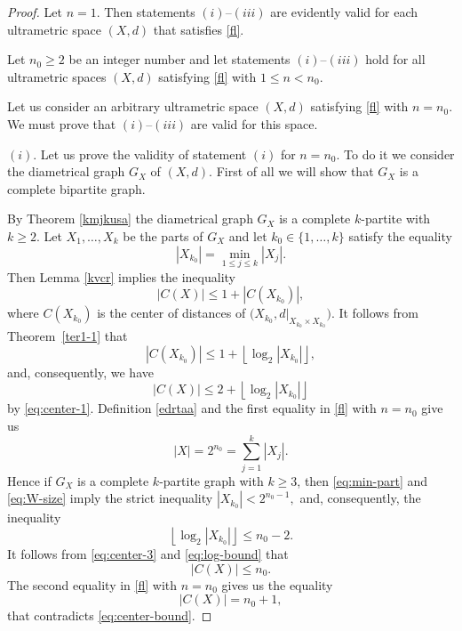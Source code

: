 \documentclass{raex}
\theoremstyle{definition}
\theoremstyle{remark}
\numberwithin{equation}{section}
\begin{document}
\begin{proof}
Let $n=1$. Then statements $(i)$--$(iii)$ are evidently valid for each ultrametric space $(X,d)$ that satisfies \eqref{fl}.

Let $n_0 \geq 2$ be an integer number and let statements $(i)$--$(iii)$ hold for all ultrametric spaces $(X,d)$ satisfying \eqref{fl} with $1\leq n<n_0$.

Let us consider an arbitrary ultrametric space $(X,d)$ satisfying \eqref{fl} with $n=n_0$. We must prove that $(i)$--$(iii)$ are valid for this space.

$(i)$. Let us prove the validity of statement $(i)$ for $n=n_0$. To do it we consider the diametrical graph $G_X$ of $(X,d)$. First of all we will show that $G_X$ is a complete bipartite graph.

By Theorem \ref{kmjkusa} the diametrical graph $G_X$ is a complete $k$-partite with $k\ge 2$.  Let $X_1,\dots,X_k$ be the parts of $G_X$ and let $k_0\in\{1,\dots,k\}$ satisfy the equality
\begin{equation}\label{eq:min-part}
|X_{k_0}|=\min_{1\le j\le k}|X_j|.
\end{equation}
Then Lemma \ref{kvcr} implies the inequality
\begin{equation}\label{eq:center-1}
|C(X)|\le 1+|C(X_{k_0})|,
\end{equation}
where $C(X_{k_0})$ is the center of distances of $\bigl(X_{k_0},d|_{X_{k_0}\times X_{k_0}}\bigr)$. It follows from Theorem~\ref{ter1-1} that
\begin{equation*}
|C(X_{k_0})|\le 1+\left\lfloor \log_2 |X_{k_0}| \right\rfloor,
\end{equation*}
and, consequently, we have
\begin{equation}\label{eq:center-3}
|C(X)|\le 2+\left\lfloor \log_2 |X_{k_0}| \right\rfloor
\end{equation}
by \eqref{eq:center-1}.
Definition \ref{edrtaa} and the first equality in \eqref{fl} with $n=n_0$ give us
\begin{equation}\label{eq:W-size}
|X|=2^{n_0}=\sum_{j=1}^{k}|X_j|.
\end{equation}
Hence if $G_X$ is a complete $k$-partite graph with $k\geq 3$, then \eqref{eq:min-part} and \eqref{eq:W-size} imply the strict inequality
\(
|X_{k_0}|<2^{n_0-1},
\)
and, consequently,  the inequality
\begin{equation}\label{eq:log-bound}
\left\lfloor \log_2 |X_{k_0}| \right\rfloor \le n_0-2.
\end{equation}
It follows from \eqref{eq:center-3} and \eqref{eq:log-bound} that
\begin{equation}\label{eq:center-bound}
|C(X)|\le n_0.
\end{equation}
The second equality in \eqref{fl} with $n=n_0$ gives us the equality
\begin{equation*}
|C(X)|=n_0+1,
\end{equation*}
that contradicts \eqref{eq:center-bound}. 


\end{proof}
\end{document}
